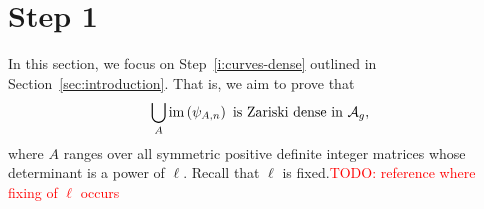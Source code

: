 \documentclass{amsart}
\begin{document}

\newpage

\section{Step 1}
\label{sec:step-1}

In this section, we focus on Step~\ref{i:curves-dense} outlined in Section~\ref{sec:introduction}. That is, we aim to prove that
\[
  \bigcup_{A} \operatorname{im}\left(\psi_{A,n}\right) \text{ is Zariski dense in } \mathcal{A}_g,
\]
where $A$ ranges over all symmetric positive definite integer matrices whose determinant is a power of $\ell$. Recall that $\ell$ is fixed.\textcolor{red}{TODO: reference where fixing of $\ell$ occurs}
\end{document}
